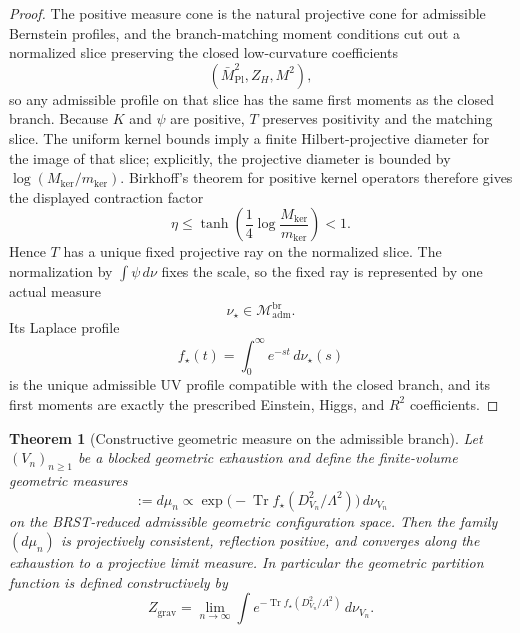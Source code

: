 \documentclass[11pt,a4paper]{article}
\newtheorem{theorem}{Theorem}[section]
\theoremstyle{definition}
\theoremstyle{remark}
\DeclareMathOperator{\tr}{Tr}
\newcommand{\Mpl}{\bar M_{\mathrm{Pl}}}
\begin{document}
\begin{proof}
The positive measure cone is the natural projective cone for admissible Bernstein profiles, and the
branch-matching moment conditions cut out a normalized slice preserving the closed low-curvature
coefficients
\[
(\Mpl^2,Z_H,M^2),
\]
so any admissible profile on that slice has the same first moments as the closed branch. Because
$K$ and $\psi$ are positive, $T$ preserves positivity and the matching slice. The uniform kernel
bounds imply a finite Hilbert-projective diameter for the image of that slice; explicitly, the
projective diameter is bounded by $\log(M_{\mathrm{ker}}/m_{\mathrm{ker}})$. Birkhoff's theorem for
positive kernel operators therefore gives the displayed contraction factor
\[
\eta\le \tanh\!\left(\frac14\log\frac{M_{\mathrm{ker}}}{m_{\mathrm{ker}}}\right)<1.
\]
Hence $T$ has a unique fixed projective ray on the normalized slice. The normalization by
$\int\psi\,d\nu$ fixes the scale, so the fixed ray is represented by one actual measure
\[
\nu_\star\in\mathcal M_{\mathrm{adm}}^{\mathrm{br}}.
\]
Its Laplace profile
\[
f_\star(t)=\int_0^\infty e^{-st}\,d\nu_\star(s)
\]
is the unique admissible UV profile compatible with the closed branch, and its first moments are
exactly the prescribed Einstein, Higgs, and $R^2$ coefficients.
\end{proof}

\begin{theorem}[Constructive geometric measure on the admissible branch]
\label{thm:constructive-geometric-measure}
Let $(V_n)_{n\ge 1}$ be a blocked geometric exhaustion and define the finite-volume geometric
measures
\[
:=
d\mu_n
\propto
\exp\!\bigl(-\tr f_\star(D_{V_n}^2/\Lambda^2)\bigr)\,d\nu_{V_n}
\]
on the BRST-reduced admissible geometric configuration space. Then the family $(d\mu_n)$ is
projectively consistent, reflection positive, and converges along the exhaustion to a projective
limit measure. In particular the geometric partition function is defined constructively by
\[
Z_{\mathrm{grav}}
=
\lim_{n\to\infty}
\int e^{-\tr f_\star(D_{V_n}^2/\Lambda^2)}\,d\nu_{V_n}.
\]
\end{theorem}
\end{document}
